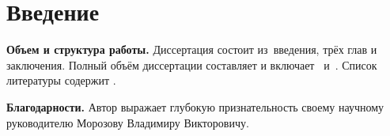 \chapter*{Введение}							%

\newcommand{\actuality}{\textbf\actualityTXT}
\newcommand{\progress}{}
\newcommand{\aim}{{\textbf\aimTXT}}
\newcommand{\tasks}{\textbf{\tasksTXT}}
\newcommand{\researchsubject}{\textbf{\researchsubjectTXT}}
\newcommand{\novelty}{\textbf{\noveltyTXT}}
\newcommand{\influence}{\textbf{\influenceTXT}}
\newcommand{\methods}{\textbf{\methodsTXT}}
\newcommand{\defpositions}{\textbf{\defpositionsTXT}}
\newcommand{\reliability}{\textbf{\reliabilityTXT}}
\newcommand{\probation}{\textbf{\probationTXT}}
\newcommand{\contribution}{\textbf{\contributionTXT}}
\newcommand{\publications}{\textbf{\publicationsTXT}}


\textbf{Объем и структура работы.} Диссертация состоит из~введения, трёх глав и
заключения. Полный объём диссертации составляет
 и
включает~
и~. Список литературы содержит
.

\textbf{Благодарности.} Автор выражает глубокую признательность своему научному
руководителю Морозову Владимиру Викторовичу.
